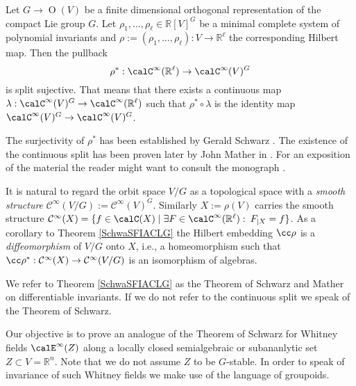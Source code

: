 \begin{theorem} \label{SchwaSFIACLG} Let $G\to \operatorname{O}(V)$ be a finite dimensional orthogonal representation of the compact Lie group $G$. Let $\rho_1,\dots,\rho_\ell\in\mathbb R[V]^G$ be a minimal complete system of polynomial invariants and $\rho:=(\rho_1,\dots,\rho_\ell): V\to \mathbb R^\ell$ the corresponding Hilbert map. Then the pullback 
\[\rho^*:\calC^\infty(\mathbb R^\ell)\to\calC^\infty(V)^G\] 
is split sujective. That means that there exists a continuous map $\lambda:\calC^\infty(V)^G\to\calC^\infty(\mathbb R^\ell)$ such that $\rho^*\circ \lambda$ is the identity map $\calC^\infty(V)^G\to\calC^\infty(V)^G$.
\end{theorem}

The surjectivity of $\rho^*$ has been established by Gerald Schwarz \cite[Thm.~1]{SchwaSFIACLG}. The existence of the continuous split has been proven later by 
John Mather in \cite{MatDI}. For an exposition of the material the reader might want to consult the monograph \cite{BierstonesBook}. 

It is natural to regard the orbit space $V/G$ as a topological space with a \emph{smooth structure} $\mathcal C^\infty(V/G):=\mathcal C^\infty(V)^G$. Similarly $X:=\rho(V)$ carries the smooth structure $\mathcal C^\infty(X)=\{f\in \calC(X)\mid \exists F\in \calC^\infty(\mathbb R^\ell):\: F_{|X}=f\}$. As a corollary to Theorem  \ref{SchwaSFIACLG} the Hilbert embedding $\cc\rho$ is a \emph{diffeomorphism} of $V/G$ onto $X$, i.e., a homeomorphism such that 
$\cc\rho^*:\mathcal C^\infty(X)\to \mathcal C^\infty(V/G)$ is an isomorphism of algebras.
 
We refer to Theorem \ref{SchwaSFIACLG} as the Theorem of Schwarz and Mather on differentiable invariants. If we do not refer to the continuous split we speak of the Theorem of Schwarz. 

Our objective is to prove an analogue of the Theorem of Schwarz for  Whitney fields $\calE^\infty(Z)$ along a 
locally closed semialgebraic or subananlytic set $Z\subset V=\mathbb R^n$. Note that we do not assume $Z$ to be 
$G$-stable. In order to speak of invariance of such Whitney fields we make use of the language of groupoids. \\


